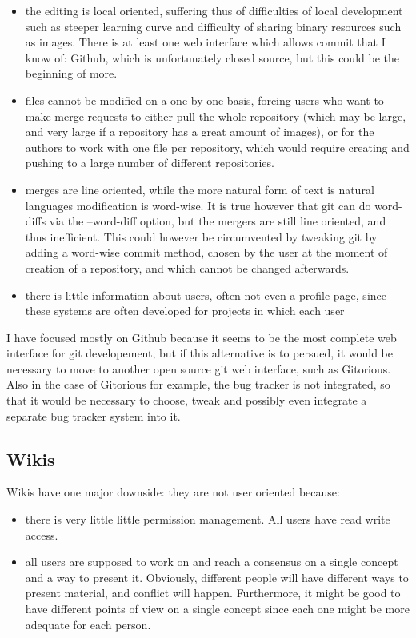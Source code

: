 \documentclass[12pt]{article}
\begin{document}
\begin{itemize}
  \item the editing is local oriented, suffering thus of difficulties of local development such as steeper learning curve and difficulty of sharing binary resources such as images. There is at least one web interface which allows commit that I know of: Github, which is unfortunately closed source, but this could be the beginning of more.
  
  \item files cannot be modified on a one-by-one basis, forcing users who want to make merge requests to either pull the whole repository (which may be large, and very large if a repository has a great amount of images), or for the authors to work with one file per repository, which would require creating and pushing to a large number of different repositories.
  
  \item merges are line oriented, while the more natural form of text is natural languages modification is word-wise. It is true however that git can do word-diffs via the --word-diff option, but the mergers are still line oriented, and thus inefficient. This could however be circumvented by tweaking git by adding a word-wise commit method, chosen by the user at the moment of creation of a repository, and which cannot be changed afterwards.
  
  \item there is little information about users, often not even a profile page, since these systems are often developed for projects in which each user 
\end{itemize}

I have focused mostly on Github because it seems to be the most complete web interface for git developement, but if this alternative is to persued, it would be necessary to move to another open source git web interface, such as Gitorious. Also in the case of Gitorious for example, the bug tracker is not integrated, so that it would be necessary to choose, tweak and possibly even integrate a separate bug tracker system into it.

\subsection{Wikis}

Wikis have one major downside: they are not user oriented because:

\begin{itemize}
  \item there is very little little permission management. All users have read write access.
  \item all users are supposed to work on and reach a consensus on a single concept and a way to present it. Obviously, different people will have different ways to present material, and conflict will happen. Furthermore, it might be good to have different points of view on a single concept since each one might be more adequate for each person.
\end{itemize}
\end{document}

